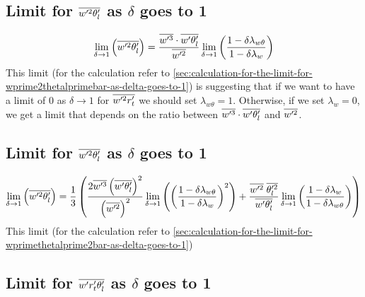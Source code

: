 \subsection{Limit for \texorpdfstring{$\overline{w'^2 \theta_l'}$}{wprime2thetalbar} as \texorpdfstring{$\delta$}{delta} goes to 1}
\label{subsec:limit-for-wprime2thetalbar-as-delta-goes-to-1}

\begin{align}
    \label{eq:limit_wprime2thetalbar_delta_to_1}
    \lim_{\delta \to 1}\left(\overline{w'^2 \theta_l'}\right)
    = \frac{\overline{w'^3} \cdot \overline{w'\theta_l'}}{\overline{w'^2}}
    \lim_{\delta \to 1}
    \left(\frac{1 - \delta \lambda_{w\theta}}{1-\delta \lambda_w}\right)
\end{align}
This limit (for the calculation refer to \cref{sec:calculation-for-the-limit-for-wprime2thetalprimebar-as-delta-goes-to-1})
is suggesting that if we want to have a limit of 0 as $\delta \to 1$ for $\overline{w'^2 r_t'}$ we should set $\lambda_{w\theta} = 1$.
Otherwise, if we set $\lambda_w = 0$, we get a limit that depends on the ratio between $\overline{w'^3} \cdot \overline{w' \theta_l'}$ and $\overline{w'^2}$.

\subsection{Limit for \texorpdfstring{$\overline{w'^2 \theta_l'}$}{wprimethetaltwobar} as \texorpdfstring{$\delta$}{delta} goes to 1}
\label{subsec:limit-for-wprimethetal2bar-as-delta-goes-to-1}

\begin{align}
    \label{eq:limit_wprimethetalprime2bar_delta_to_1}
    \lim_{\delta \to 1}\left(\overline{w'^2 \theta_l'}\right)
    = \frac{1}{3}\left(
    \frac{2 \overline{w'^3} \left(\overline{w' \theta_l'} \right)^2}{\left(\overline{w'^2} \right)^2} \lim_{\delta \to 1}
    \left(\left(\frac{1-\delta \lambda_{w \theta}}{1-\delta \lambda_w}\right)^2\right) +
    \frac{\overline{w'^2} \; \overline{\theta_l'^2}}{\overline{w' \theta_l'}}
    \lim_{\delta \to 1}
    \left(\frac{1-\delta \lambda_w}{1-\delta \lambda_{w \theta}}\right)
    \right)
\end{align}
This limit (for the calculation refer to \cref{sec:calculation-for-the-limit-for-wprimethetalprime2bar-as-delta-goes-to-1})

\subsection{Limit for \texorpdfstring{$\overline{w' r_t' \theta_l'}$}{wprimertprimethetalbar} as \texorpdfstring{$\delta$}{delta} goes to 1}
\label{subsec:limit-for-wprimertprimethetalbar-as-delta-goes-to-1}

